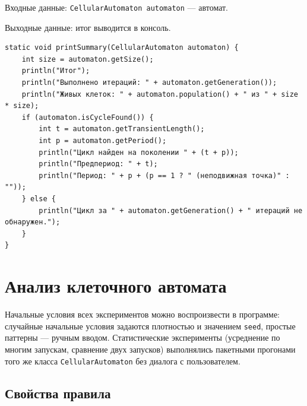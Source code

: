 \documentclass[a4paper,14pt]{extarticle}
\begin{document}
Входные данные: \texttt{CellularAutomaton automaton} --- автомат.

Выходные данные: итог выводится в консоль.

\begin{lstlisting}[caption={Метод printSummary()}, label={lst:printsummary}]
static void printSummary(CellularAutomaton automaton) {
	int size = automaton.getSize();
	println("Итог");
	println("Выполнено итераций: " + automaton.getGeneration());
	println("Живых клеток: " + automaton.population() + " из " + size * size);
	if (automaton.isCycleFound()) {
		int t = automaton.getTransientLength();
		int p = automaton.getPeriod();
		println("Цикл найден на поколении " + (t + p));
		println("Предпериод: " + t);
		println("Период: " + p + (p == 1 ? " (неподвижная точка)" : ""));
	} else {
		println("Цикл за " + automaton.getGeneration() + " итераций не обнаружен.");
	}
}
\end{lstlisting}


\newpage
\section{Анализ клеточного автомата}
\label{sec:analysis}

Начальные условия всех экспериментов можно воспроизвести в программе: случайные начальные условия задаются плотностью и значением \texttt{seed}, простые паттерны --- ручным вводом. Статистические эксперименты (усреднение по многим запускам, сравнение двух запусков) выполнялись пакетными прогонами того же класса \texttt{CellularAutomaton} без диалога с пользователем.

\subsection{Свойства правила}
\end{document}
